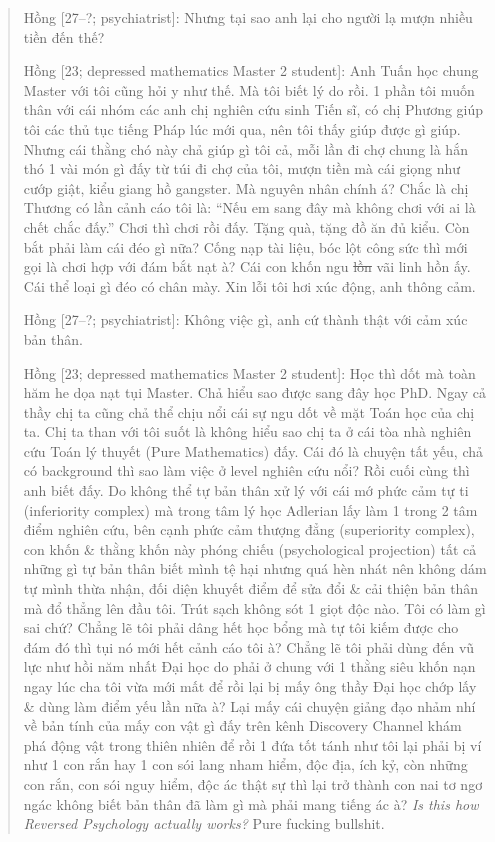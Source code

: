 \documentclass[12pt,oneside]{book}
\begin{document}
\begin{quote}
	{\sf Hồng [27--?; psychiatrist]}: Nhưng tại sao anh lại cho người lạ mượn nhiều tiền đến thế?
	
	{\sf Hồng [23; depressed mathematics Master 2 student]}: Anh Tuấn học chung Master với tôi cũng hỏi y như thế. Mà tôi biết lý do rồi. 1 phần tôi muốn thân với cái nhóm các anh chị nghiên cứu sinh Tiến sĩ, có chị Phương giúp tôi các thủ tục tiếng Pháp lúc mới qua, nên tôi thấy giúp được gì giúp. Nhưng cái thằng chó này chả giúp gì tôi cả, mỗi lần đi chợ chung là hắn thó 1 vài món gì đấy từ túi đi chợ của tôi, mượn tiền mà cái giọng như cướp giật, kiểu giang hồ gangster. Mà nguyên nhân chính á? Chắc là chị Thương có lần cảnh cáo tôi là: ``Nếu em sang đây mà không chơi với ai là chết chắc đấy.'' Chơi thì chơi rồi đấy. Tặng quà, tặng đồ ăn đủ kiểu. Còn bắt phải làm cái đéo gì nữa? Cống nạp tài liệu, bóc lột công sức thì mới gọi là chơi hợp với đám bắt nạt à? Cái con khốn ngu \st{lồn} vãi linh hồn ấy. Cái thể loại gì đéo có chân mày. Xin lỗi tôi hơi xúc động, anh thông cảm.
	
	{\sf Hồng [27--?; psychiatrist]}: Không việc gì, anh cứ thành thật với cảm xúc bản thân.
	
	{\sf Hồng [23; depressed mathematics Master 2 student]}: Học thì dốt mà toàn hăm he dọa nạt tụi Master. Chả hiểu sao được sang đây học PhD. Ngay cả thầy chị ta cũng chả thể chịu nổi cái sự ngu dốt về mặt Toán học của chị ta. Chị ta than với tôi suốt là không hiểu sao chị ta ở cái tòa nhà nghiên cứu Toán lý thuyết (Pure Mathematics) đấy. Cái đó là chuyện tất yếu, chả có background thì sao làm việc ở level nghiên cứu nổi? Rồi cuối cùng thì anh biết đấy. Do không thể tự bản thân xử lý với cái mớ phức cảm tự ti (inferiority complex) mà trong tâm lý học Adlerian lấy làm 1 trong 2 tâm điểm nghiên cứu, bên cạnh phức cảm thượng đẳng (superiority complex), con khốn \& thằng khốn này phóng chiếu (psychological projection) tất cả những gì tự bản thân biết mình tệ hại nhưng quá hèn nhát nên không dám tự mình thừa nhận, đối diện khuyết điểm để sửa đổi \& cải thiện bản thân mà đổ thẳng lên đầu tôi. Trút sạch không sót 1 giọt độc nào. Tôi có làm gì sai chứ? Chẳng lẽ tôi phải dâng hết học bổng mà tự tôi kiếm được cho đám đó thì tụi nó mới hết cảnh cáo tôi à? Chẳng lẽ tôi phải dùng đến vũ lực như hồi năm nhất Đại học do phải ở chung với 1 thằng siêu khốn nạn ngay lúc cha tôi vừa mới mất để rồi lại bị mấy ông thầy Đại học chớp lấy \& dùng làm điểm yếu lần nữa à? Lại mấy cái chuyện giảng đạo nhảm nhí về bản tính của mấy con vật gì đấy trên kênh Discovery Channel khám phá động vật trong thiên nhiên để rồi 1 đứa tốt tánh như tôi lại phải bị ví như 1 con rắn hay 1 con sói lang nham hiểm, độc địa, ích kỷ, còn những con rắn, con sói nguy hiểm, độc ác thật sự thì lại trở thành con nai tơ ngơ ngác không biết bản thân đã làm gì mà phải mang tiếng ác à? {\it Is this how Reversed Psychology actually works?} Pure fucking bullshit.
	

\end{quote}
\end{document}
